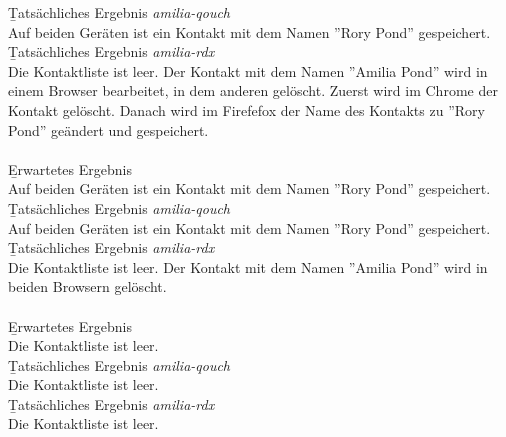 \b{Tatsächliches Ergebnis \it{amilia-qouch}}\\
Auf beiden Geräten ist ein Kontakt mit dem Namen ''Rory Pond'' gespeichert.\\
\b{Tatsächliches Ergebnis \it{amilia-rdx}}\\
Die Kontaktliste ist leer.
%
Der Kontakt mit dem Namen ''Amilia Pond'' wird in einem Browser bearbeitet, in dem anderen gelöscht.
Zuerst wird im Chrome der Kontakt gelöscht. 
Danach wird im Firefefox der Name des Kontakts zu ''Rory Pond'' geändert und gespeichert.\\\\
\b{Erwartetes Ergebnis}\\
Auf beiden Geräten ist ein Kontakt mit dem Namen ''Rory Pond'' gespeichert.\\
\b{Tatsächliches Ergebnis \it{amilia-qouch}}\\
Auf beiden Geräten ist ein Kontakt mit dem Namen ''Rory Pond'' gespeichert.\\
\b{Tatsächliches Ergebnis \it{amilia-rdx}}\\
Die Kontaktliste ist leer.
%
Der Kontakt mit dem Namen ''Amilia Pond'' wird in beiden Browsern gelöscht.\\\\
\b{Erwartetes Ergebnis}\\
Die Kontaktliste ist leer.\\
\b{Tatsächliches Ergebnis \it{amilia-qouch}}\\
Die Kontaktliste ist leer.\\
\b{Tatsächliches Ergebnis \it{amilia-rdx}}\\
Die Kontaktliste ist leer.